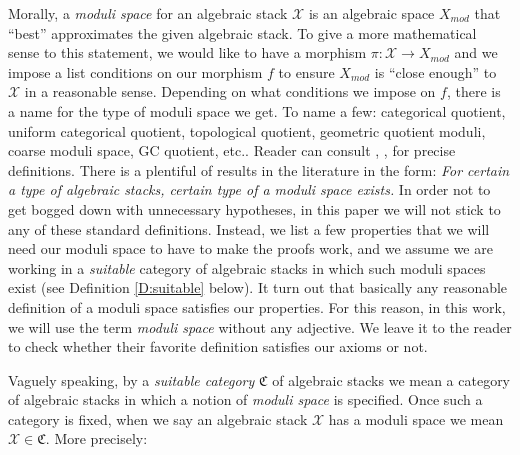 \documentclass{amsart}
\theoremstyle{definition}
\theoremstyle{remark}
\theoremstyle{remark}
\newcommand{\X}{\mathcal{X}}
\newcommand{\Xm}{X_{mod}}
\let\:=\colon
\begin{document}
Morally, a {\em moduli space} for an algebraic stack $\X$ is an
algebraic space $\Xm$ that ``best'' approximates the given
algebraic stack. To give a more mathematical sense to this
statement, we would like to have a morphism $\pi \: \X \to \Xm$
and we impose a list conditions on our morphism $f$ to ensure
$\Xm$ is  ``close enough'' to $\X$ in a reasonable sense.
Depending on what conditions we impose on $f$, there is a name
 for the type of moduli space we get. To name a few: categorical
 quotient, uniform categorical quotient,
 topological quotient, geometric quotient moduli, coarse moduli
 space, GC quotient, etc.. Reader can consult
 \cite{Mumford}, \cite{KM}, \cite{Kollar}  for  precise
 definitions. There is a plentiful of results in the literature
 in the form:  {\it For certain a type of algebraic stacks,
 certain type of a moduli space exists.}
 In order not to get bogged down with unnecessary
 hypotheses, in this paper we will not stick to any of these
 standard definitions.  Instead, we list a few
properties that we will need our moduli space to have to make the
proofs work, and we assume we are working in a {\em suitable}
category of algebraic stacks in which such moduli spaces exist
(see Definition \ref{D:suitable} below). It turn out that
basically any reasonable definition of a  moduli space satisfies
our properties. For this reason, in this work, we will use the
term {\em moduli space} without any adjective. We leave it to the
reader to check whether their favorite definition satisfies our
axioms or not.

Vaguely speaking, by a {\em suitable category} $\mathfrak{C}$ of
algebraic stacks we mean a category of algebraic stacks in which a
notion of  {\em moduli space} is specified. Once such a category
is fixed, when we say an algebraic stack $\X$ has a moduli space
we mean $\X \in \mathfrak{C}$. More precisely:
\end{document}
